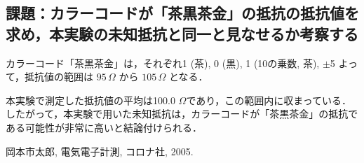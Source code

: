 \documentclass{ltjsarticle}
\begin{document}
\subsection*{課題：カラーコードが「茶黒茶金」の抵抗の抵抗値を求め，本実験の未知抵抗と同一と見なせるか考察する}
カラーコード「茶黒茶金」は，それぞれ1 (茶), 0 (黒), 1 (10の乗数, 茶), $\pm$5%
よって，抵抗値の範囲は $95 \, \Omega$ から $105 \, \Omega$ となる．

本実験で測定した抵抗値の平均は100.0 $\Omega$であり，この範囲内に収まっている．したがって，本実験で用いた未知抵抗は，カラーコードが「茶黒茶金」の抵抗である可能性が非常に高いと結論付けられる．

\begin{thebibliography}{9}
 岡本市太郎, 電気電子計測, コロナ社, 2005.
\end{thebibliography}
\end{document}

